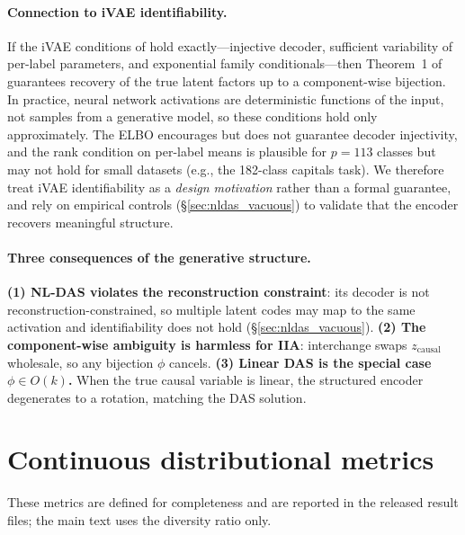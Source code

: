 \paragraph{Connection to iVAE identifiability.}
\label{prop:recovery}
If the iVAE conditions of \citet{khemakhem2020variational} hold exactly---injective
decoder, sufficient variability of per-label parameters, and exponential family
conditionals---then Theorem~1 of \citet{khemakhem2020variational} guarantees
recovery of the true latent factors up to a component-wise bijection. In
practice, neural network activations are deterministic functions of the input,
not samples from a generative model, so these conditions hold only
approximately. The ELBO encourages but does not guarantee decoder injectivity,
and the rank condition on per-label means is plausible for $p = 113$ classes
but may not hold for small datasets (e.g., the 182-class capitals task).
We therefore treat iVAE identifiability as a \emph{design motivation} rather
than a formal guarantee, and rely on empirical controls
(\S\ref{sec:nldas_vacuous}) to validate that the encoder recovers
meaningful structure.

\paragraph{Three consequences of the generative structure.}
\textbf{(1) NL-DAS violates the reconstruction constraint}:
its decoder is not reconstruction-constrained, so multiple latent codes may
map to the same activation and identifiability does not hold
(\S\ref{sec:nldas_vacuous}).
\textbf{(2) The component-wise ambiguity is harmless for IIA}:
interchange swaps $z_\text{causal}$ wholesale, so any bijection $\phi$ cancels.
\textbf{(3) Linear DAS is the special case $\phi \in O(k)$.}
When the true causal variable is linear, the structured encoder degenerates
to a rotation, matching the DAS solution.



\section{Continuous distributional metrics}
\label{app:continuous_metrics}

These metrics are defined for completeness and are reported in the
released result files; the main text uses the diversity ratio only.

